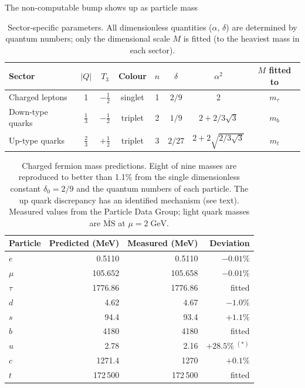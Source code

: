 \documentclass[final]{beamer}
\newlength{\colwidth}
\begin{document}
\begin{frame}[t]
\begin{columns}[t]
\begin{column}{\colwidth}
\begin{block}{The non-computable bump shows up as particle mass}
\begin{table}[t]
  \centering
  \caption{Sector-specific parameters. All dimensionless quantities ($\alpha$, $\delta$) are determined by quantum numbers; only the dimensional scale $M$ is fitted (to the heaviest mass in each sector).}
  \label{tab:inputs}
  \begin{tabular}{lccccccc}
    \toprule
    Sector & $|Q|$ & $T_3$ & Colour & $n$ & $\delta$ & $\alpha^2$ & $M$ fitted to \\
    \midrule
    Charged leptons & 1 & $-\tfrac{1}{2}$ & singlet & 1 & $2/9$ & 2 & $m_\tau$ \\
    Down-type quarks & $\tfrac{1}{3}$ & $-\tfrac{1}{2}$ & triplet & 2 & $1/9$ & $2 + 2/3\sqrt{3}$ & $m_b$ \\
    Up-type quarks & $\tfrac{2}{3}$ & $+\tfrac{1}{2}$ & triplet & 3 & $2/27$ & $2 + 2\sqrt{2/3\sqrt{3}}$ & $m_t$ \\
    \bottomrule
  \end{tabular}
\end{table}

\begin{table}[t]
  \centering
  \caption{Charged fermion mass predictions. Eight of nine masses are reproduced to better than 1.1\% from the single dimensionless constant $\delta_0 = 2/9$ and the quantum numbers of each particle. The up quark discrepancy has an identified mechanism (see text). Measured values from the Particle Data Group; light quark masses are $\overline{\mathrm{MS}}$ at $\mu = 2\;\mathrm{GeV}$.}
  \label{tab:masses}
  \begin{tabular}{lrrr}
    \toprule
    Particle & Predicted (MeV) & Measured (MeV) & Deviation \\
    \midrule
    $e$ & 0.5110 & 0.5110 & $-0.01\%$ \\
    $\mu$ & 105.652 & 105.658 & $-0.01\%$ \\
    $\tau$ & 1776.86 & 1776.86 & fitted \\[4pt]
    $d$ & 4.62 & 4.67 & $-1.0\%$ \\
    $s$ & 94.4 & 93.4 & $+1.1\%$ \\
    $b$ & 4180 & 4180 & fitted \\[4pt]
    $u$ & 2.78 & 2.16 & $+28.5\%\;^{(*)}$ \\
    $c$ & 1271.4 & 1270 & $+0.1\%$ \\
    $t$ & 172\,500 & 172\,500 & fitted \\
    \bottomrule
  \end{tabular}
\end{table}


\end{block}
\end{column}
\end{columns}
\end{frame}
\end{document}
